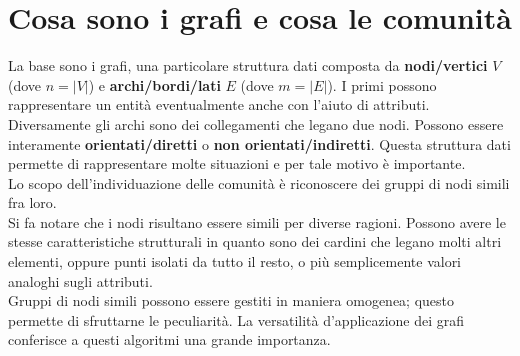 \section{Cosa sono i grafi e cosa le comunità}
La base sono i grafi, una particolare struttura dati composta da \textbf{nodi/vertici} $V$ (dove $n=|V|$) e \textbf{archi/bordi/lati} $E$ (dove $m=|E|$). I primi possono rappresentare un entità eventualmente anche con l'aiuto di attributi. Diversamente gli archi sono dei collegamenti che legano due nodi. Possono essere interamente \textbf{orientati/diretti} o \textbf{non orientati/indiretti}. Questa struttura dati permette di rappresentare molte situazioni e per tale motivo è importante.\\
Lo scopo dell'individuazione delle comunità è riconoscere dei gruppi di nodi simili fra loro.\\
Si fa notare che i nodi risultano essere simili per diverse ragioni. Possono avere le stesse caratteristiche strutturali in quanto sono dei cardini che legano molti altri elementi, oppure punti isolati da tutto il resto, o più semplicemente  valori analoghi sugli attributi.\\
Gruppi di nodi simili possono essere gestiti in maniera omogenea; questo permette di sfruttarne le peculiarità. La versatilità d'applicazione dei grafi conferisce a questi algoritmi una grande importanza.
%
